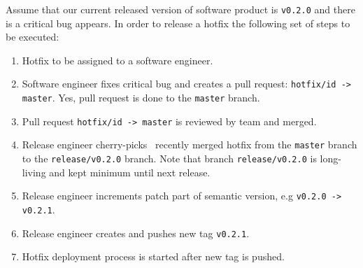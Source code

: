 ﻿Assume that our current released version of software product is \texttt{v0.2.0} and there is a critical bug appears.
In order to release a hotfix the following set of steps to be executed:
\begin{enumerate}
    \item Hotfix to be assigned to a software engineer.
    \item Software engineer fixes critical bug and creates a pull request: \texttt{hotfix/id -> master}.
    Yes, pull request is done to the \texttt{master} branch.
    \item Pull request \texttt{hotfix/id -> master} is reviewed by team and merged.
    \item Release engineer cherry-picks~\cite{CherryPick} recently merged hotfix from the \texttt{master} branch
    to the \texttt{release/v0.2.0} branch.
    Note that branch \texttt{release/v0.2.0} is long-living and kept minimum until next release.
    \item Release engineer increments patch part of semantic version, e.g \texttt{v0.2.0 -> v0.2.1}.
    \item Release engineer creates and pushes new tag \texttt{v0.2.1}.
    \item Hotfix deployment process is started after new tag is pushed.
\end{enumerate}

